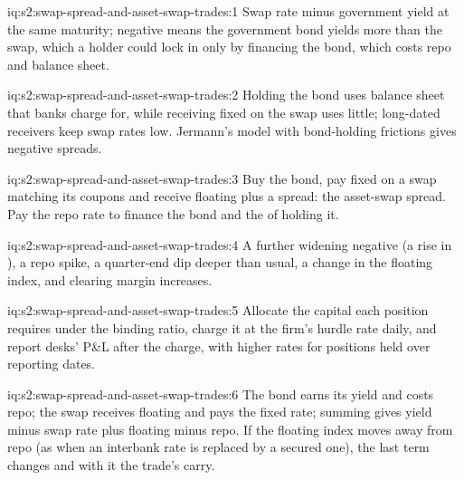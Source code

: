 \begin{solution}{iq:s2:swap-spread-and-asset-swap-trades:1}
Swap rate minus government yield at the same maturity; negative means the government bond yields more than the swap, which a holder could lock in
only by financing the bond, which costs repo and balance sheet.
\end{solution}

\begin{solution}{iq:s2:swap-spread-and-asset-swap-trades:2}
Holding the bond uses balance sheet that banks charge for, while receiving fixed on the swap uses little; long-dated receivers keep swap rates low.
Jermann's model with bond-holding frictions gives negative spreads.
\end{solution}

\begin{solution}{iq:s2:swap-spread-and-asset-swap-trades:3}
Buy the bond, pay fixed on a swap matching its coupons and receive floating plus a spread: the asset-swap spread. Pay the repo rate to finance the
bond and the  of holding it.
\end{solution}

\begin{solution}{iq:s2:swap-spread-and-asset-swap-trades:4}
A further widening negative (a rise in ), a repo spike, a quarter-end dip deeper than usual, a change in the floating index, and
clearing margin increases.
\end{solution}

\begin{solution}{iq:s2:swap-spread-and-asset-swap-trades:5}
Allocate the capital each position requires under the binding ratio, charge it at the firm's hurdle rate daily, and report desks' P\&L after the
charge, with higher rates for positions held over reporting dates.
\end{solution}

\begin{solution}{iq:s2:swap-spread-and-asset-swap-trades:6}
The bond earns its yield and costs repo; the swap receives floating and pays the fixed rate; summing gives yield minus swap rate plus floating minus
repo. If the floating index moves away from repo (as when an interbank rate is replaced by a secured one), the last term changes and with it the
trade's carry.
\end{solution}
